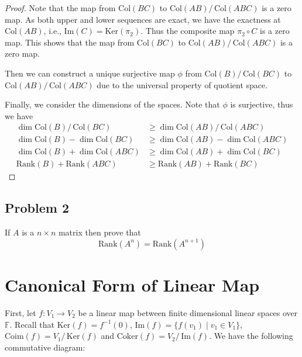 \documentclass[
	11pt, %
	fleqn, %
	a4paper, %
]{LegrandOrangeBook}
\renewcommand{\ker}[1]{\text{Ker}(#1)} %
\renewcommand{\Im}[1]{\text{Im}(#1)} %
\newcommand{\quotient}[2]{#1 /\, #2} %
\newcommand{\F}{\mathbb{F}} %
\newcommand{\rank}[1]{\text{Rank}(#1)} %
\newcommand{\coker}[1]{\text{Coker}(#1)} %
\newcommand{\coim}[1]{\text{Coim}(#1)} %
\newcommand{\col}[1]{\text{Col}(#1)} %
\begin{document}
\begin{proof}
    Note that the map from $\col{BC}$ to $\quotient{\col{AB}}{\col{ABC}}$ is a zero map. As both upper and lower sequences are exact, we have the exactness at $\col{AB}$, i.e., $\Im{C} = \ker{\pi_2}$. Thus the composite map $\pi_2 \circ C$ is a zero map. This shows that the map from $\col{BC}$ to $\quotient{\col{AB}}{\col{ABC}}$ is a zero map.

    Then we can construct a unique surjective map $\phi$ from $\quotient{\col{B}}{\col{BC}}$ to $\quotient{\col{AB}}{\col{ABC}}$ due to the universal property of quotient space.

    Finally, we consider the dimensions of the spaces. Note that $\phi$ is surjective, thus we have
    \[
        \begin{split}
            \dim{\quotient{\col{B}}{\col{BC}}} & \geq \dim{\quotient{\col{AB}}{\col{ABC}}} \\
            \dim{\col{B}} - \dim{\col{BC}} & \geq \dim{\col{AB}} - \dim{\col{ABC}} \\
            \dim{\col{B}} + \dim{\col{ABC}} & \geq \dim{\col{AB}} + \dim{\col{BC}} \\
            \rank{B} + \rank{ABC} & \geq \rank{AB} + \rank{BC}
        \end{split}
    \]
\end{proof}

\subsection{Problem 2}

\begin{problem}
    If $A$ is a $n \times n$ matrix then prove that
    \[
        \rank{A^n} = \rank{A^{n+1}}
    \]
\end{problem}


\newpage

\section{Canonical Form of Linear Map}

First, let $f : V_1 \to V_2$ be a linear map between finite dimensional linear spaces over $\F$. Recall that $\ker{f} = f^{-1} (0)$, $\Im{f} = \{f(v_1) \mid v_1 \in V_1\}$, $\coim{f} = \quotient{V_1}{\ker{f}}$ and $\coker{f} = \quotient{V_2}{\Im{f}}$. We have the following commutative diagram:

\begin{center}
\end{center}
\end{document}
